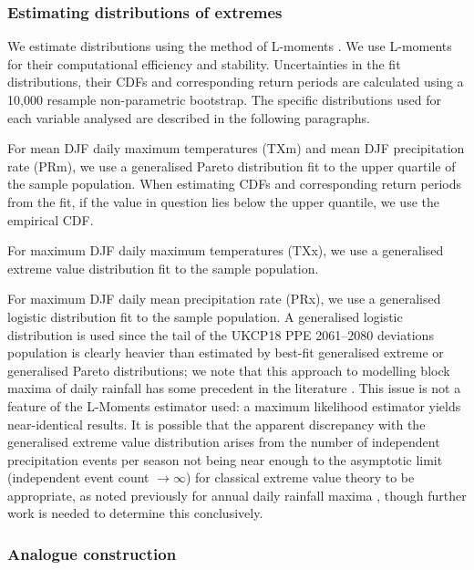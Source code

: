     \subsubsection{Estimating distributions of extremes}

      We estimate distributions using the method of L-moments \citep{hosking_estimation_1985,hosking_l-moments_1990,hosking_regional_1997}. We use L-moments for their computational efficiency and stability. Uncertainties in the fit distributions, their CDFs and corresponding return periods are calculated using a 10,000 resample non-parametric bootstrap. The specific distributions used for each variable analysed are described in the following paragraphs.
      
      For mean DJF daily maximum temperatures (TXm) and mean DJF precipitation rate (PRm), we use a generalised Pareto distribution \citep{coles_introduction_2001,hosking_parameter_1987} fit to the upper quartile of the sample population. When estimating CDFs and corresponding return periods from the fit, if the value in question lies below the upper quantile, we use the empirical CDF.

      For maximum DJF daily maximum temperatures (TXx), we use a generalised extreme value distribution fit to the sample population.

      For maximum DJF daily mean precipitation rate (PRx), we use a generalised logistic distribution \citep{hosking_l-moments_1990} fit to the sample population. A generalised logistic distribution is used since the tail of the UKCP18 PPE 2061--2080 deviations population is clearly heavier than estimated by best-fit generalised extreme or generalised Pareto distributions; we note that this approach to modelling block maxima of daily rainfall has some precedent in the literature \citep{kysely_probability_2007,wan_zin_best_2009}. This issue is not a feature of the L-Moments estimator used: a maximum likelihood estimator yields near-identical results. It is possible that the apparent discrepancy with the generalised extreme value distribution arises from the number of independent precipitation events per season not being near enough to the asymptotic limit (independent event count $\rightarrow \infty$) for classical extreme value theory to be appropriate, as noted previously for annual daily rainfall maxima \citep{marani_metastatistical_2015}, though further work is needed to determine this conclusively.

    \cleardoublepage
    \subsubsection{Analogue construction}

